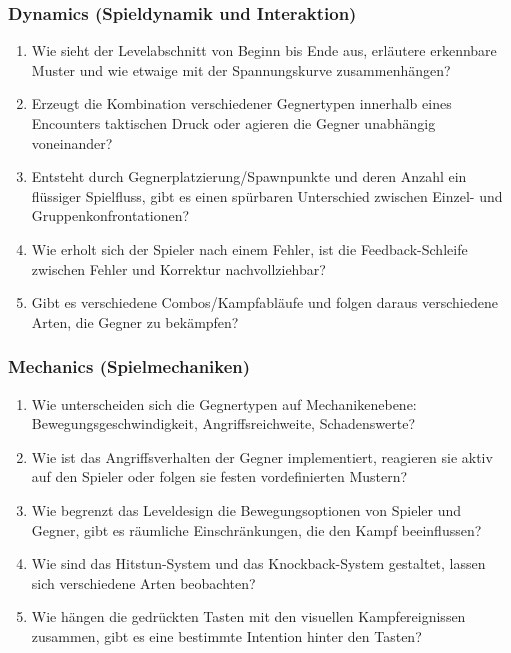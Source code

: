 \documentclass[../Main.tex]{subfiles}
\begin{document}
\subsubsection{Dynamics (Spieldynamik und Interaktion)}

\begin{enumerate}[label=\textbf{D\arabic*}, leftmargin=1.5cm, itemsep=0.5em]
    \item Wie sieht der Levelabschnitt von Beginn bis Ende aus, erläutere erkennbare Muster und wie etwaige mit der Spannungskurve zusammenhängen?
    \item Erzeugt die Kombination verschiedener Gegnertypen innerhalb eines Encounters taktischen Druck oder agieren die Gegner unabhängig voneinander?
    \item Entsteht durch Gegnerplatzierung/Spawnpunkte und deren Anzahl ein flüssiger Spielfluss, gibt es einen spürbaren Unterschied zwischen Einzel- und Gruppenkonfrontationen?
    \item Wie erholt sich der Spieler nach einem Fehler, ist die Feedback-Schleife zwischen Fehler und Korrektur nachvollziehbar?
    \item Gibt es verschiedene Combos/Kampfabläufe und folgen daraus verschiedene Arten, die Gegner zu bekämpfen?
\end{enumerate}

\subsubsection{Mechanics (Spielmechaniken)}

\begin{enumerate}[label=\textbf{M\arabic*}, leftmargin=1.5cm, itemsep=0.5em]
    \item Wie unterscheiden sich die Gegnertypen auf Mechanikenebene: Bewegungsgeschwindigkeit, Angriffsreichweite, Schadenswerte?
    \item Wie ist das Angriffsverhalten der Gegner implementiert, reagieren sie aktiv auf den Spieler oder folgen sie festen vordefinierten Mustern?
    \item Wie begrenzt das Leveldesign die Bewegungsoptionen von Spieler und Gegner, gibt es räumliche Einschränkungen, die den Kampf beeinflussen?
    \item Wie sind das Hitstun-System und das Knockback-System gestaltet, lassen sich verschiedene Arten beobachten?
    \item Wie hängen die gedrückten Tasten mit den visuellen Kampfereignissen zusammen, gibt es eine bestimmte Intention hinter den Tasten?
\end{enumerate}
\end{document}
